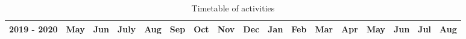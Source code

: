 \begin{landscape}
\begin{table}[H]
\caption{Timetable of activities} \vspace{0.25em}
\label{tab:ganttChart}
\begin{tabular}{|l|l|l|l|l|l|l|l|l|l|l|l|l|l|l|l|l|}
\hline
2019 - 2020                                                                & May                                                                                                      & Jun                                                                                                      & July                                                                                                     & Aug                                                                                                      & Sep                                                                                                      & Oct                                                                                                         & Nov                                                                                                      & Dec                                                                            & Jan                                                                                                      & Feb                                                                                                      & Mar                                                                                                      & Apr                                                                            & May                                                                                                      & Jun                                                                                                      & Jul                                                                                                      & Aug                        \\ \hline

\end{tabular}
\end{table}
\end{landscape}
